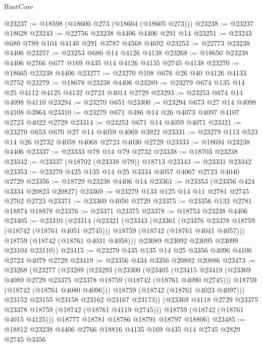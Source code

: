 \begin{lexlean}{RustCore}
\begin{coremodule}
@23237 := @18598 (@18600 @273 (@18604 (@18605 @273)))
@23238 := @23237 @18628
@23243 := @22756 @23238 @4406 @4406 @291 @14
@23251 := @23243 @680 @789 @104 @4140 @291 @3787 @4568 @4692
@23253 := @22773 @23238 @4406
@23257 := @23253 @680 @14 @4126 @4138
@23268 := @18650 @23238 @4406 @2766 @677 @169 @435 @14 @4126 @4135 @2745 @4138
@23270 := @18665 @23238 @4406
@23277 := @23270 @108 @676 @26 @40 @4126 @4133 @2752
@23279 := @18678 @23238 @4406
@23289 := @23279 @674 @135 @14 @25 @4112 @4125 @4132 @2723 @4014 @2729
@23293 := @23253 @674 @14 @4098 @4110
@23294 := @23270 @651
@23300 := @23294 @673 @27 @14 @4098 @4108 @3964
@23310 := @23279 @671 @486 @14 @26 @4073 @4097 @4107 @2723 @4022 @2729
@23314 := @23253 @671 @14 @4059 @4071
@23321 := @23270 @653 @670 @27 @14 @4059 @4069 @3922
@23331 := @23279 @113 @523 @14 @26 @2732 @4058 @4068 @2723 @4030 @2729
@23333 := @18694 @23238 @4406
@23337 := @23333 @79 @14 @79 @2732
@23338 := @18703 @23238
@23342 := @23337 (@18702 (@23338 @79)) @18713
@23343 := @23331 @23342
@23353 := @23279 @425 @135 @14 @25 @3334 @4057 @4067 @2723 @4040 @2729
@23356 := @18729 @23238 @4406 @14
@23361 := @23353 (@23356 @424 @3334 @20823 @20827)
@23369 := @23279 @133 @125 @14 @11 @2781 @2745 @2762 @2723
@23371 := @23369 @4050 @2729
@23375 := @23356 @132 @2781 @18874 @18878
@23376 := @23371 @23375
@23378 := @18753 @23238 @4406
@23405 := @23310
    (@23314
      (@23321
        (@23343
          (@23361
            (@23376 @23378 @18759 (@18742 (@18761 @4051 @2745)))
            @18759
            (@18742 (@18761 @4041 @4057)))
          @18759
          (@18742 (@18761 @4031 @4058)))
        @23089
        @23092
        @23095
        @23099
        @23104
        @23110))
@23415 := @23279 @435 @135 @14 @25 @3356 @4096 @4106 @2723 @4079 @2729
@23419 := @23356 @434 @3356 @20882 @20886
@23473 := @23268
    (@23277
      (@23289
        (@23293
          (@23300
            (@23405
              (@23415
                @23419
                (@23369 @4089 @2729 @23375 @23378 @18759 (@18742 (@18761 @4090 @2745)))
                @18759
                (@18742 (@18761 @4080 @4096)))
              @18759
              (@18742 (@18761 @4023 @4097)))
            @23152
            @23155
            @23158
            @23162
            @23167
            @23173))
        (@23369 @4118 @2729 @23375 @23378 @18759 (@18742 (@18761 @4119 @2745)))
        @18759
        (@18742 (@18761 @4015 @4125)))
      @18777
      @18781
      @18786
      @18791
      @18797
      @18806)
@23485 := @18812 @23238 @4406 @2766 @18816 @4135 @169 @435 @14 @2745 @2829 @2745 @3356

\end{coremodule}
\end{lexlean}
